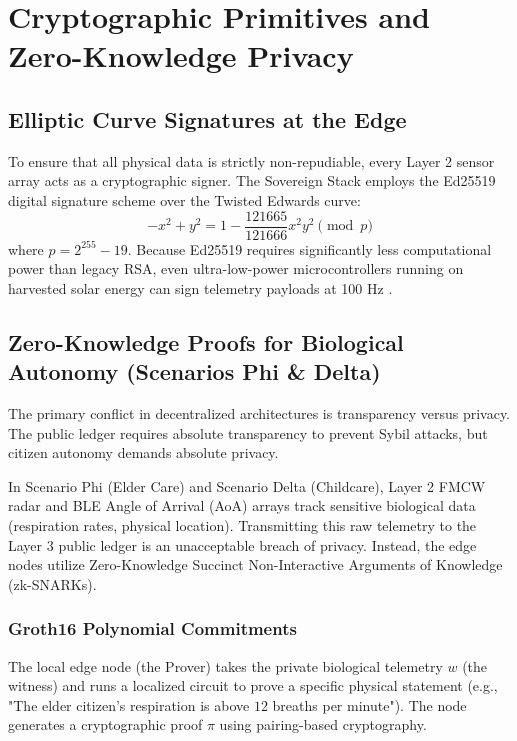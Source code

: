 \chapter{Cryptographic Primitives and Zero-Knowledge Privacy}

\section{Elliptic Curve Signatures at the Edge}
To ensure that all physical data is strictly non-repudiable, every Layer 2 sensor array acts as a cryptographic signer. The Sovereign Stack employs the Ed25519 digital signature scheme over the Twisted Edwards curve:
\begin{equation}
-x^2 + y^2 = 1 - \frac{121665}{121666} x^2 y^2 \pmod{p}
\end{equation}
where $p = 2^{255} - 19$. Because Ed25519 requires significantly less computational power than legacy RSA, even ultra-low-power microcontrollers running on harvested solar energy can sign telemetry payloads at 100 Hz \cite{bernstein2012high}.

\section{Zero-Knowledge Proofs for Biological Autonomy (Scenarios Phi \& Delta)}
The primary conflict in decentralized architectures is transparency versus privacy. The public ledger requires absolute transparency to prevent Sybil attacks, but citizen autonomy demands absolute privacy.

In Scenario Phi (Elder Care) and Scenario Delta (Childcare), Layer 2 FMCW radar and BLE Angle of Arrival (AoA) arrays track sensitive biological data (respiration rates, physical location). Transmitting this raw telemetry to the Layer 3 public ledger is an unacceptable breach of privacy. Instead, the edge nodes utilize Zero-Knowledge Succinct Non-Interactive Arguments of Knowledge (zk-SNARKs).

\subsection{Groth16 Polynomial Commitments}
The local edge node (the Prover) takes the private biological telemetry $w$ (the witness) and runs a localized circuit to prove a specific physical statement (e.g., "The elder citizen's respiration is above $12$ breaths per minute"). The node generates a cryptographic proof $\pi$ using pairing-based cryptography.

